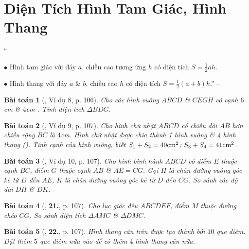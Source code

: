 \documentclass{article}
\numberwithin{equation}{section}
\newtheorem{baitoan}{Bài toán}[section]
\begin{document}

\section{Diện Tích Hình Tam Giác, Hình Thang}
``\begin{enumerate*}
	\item[$\bullet$] Hình tam giác với đáy $a$, chiều cao tương ứng $h$ có diện tích $S = \frac{1}{2}ah$.
	\item[$\bullet$] Hình thang với đáy $a$ \& $b$, chiều cao $h$ có diện tích $S = \frac{1}{2}(a + b)h$.'' -- \cite[p. 106]{Binh_Toan_6_tap_1}
\end{enumerate*}

\begin{baitoan}[\cite{Binh_Toan_6_tap_1}, Ví dụ 8, p. 106]
	Cho các hình vuông $ABCD$ \& $CEGH$ có cạnh $6$\emph{cm} \& $4$\emph{cm} \cite[Hình 36, p. 106]{Binh_Toan_6_tap_1}. Tính diện tích $\Delta BDG$.
\end{baitoan}

\begin{baitoan}[\cite{Binh_Toan_6_tap_1}, Ví dụ 9, p. 107]
	Cho hình chữ nhật $ABCD$ có chiều dài $AB$ hơn chiều rộng $BC$ là $4$\emph{cm}. Hình chữ nhật được chia thành 1 hình vuông \& 4 hình thang (\cite[Hình 38, p. 107]{Binh_Toan_6_tap_1}). Tính cạnh của hình vuông, biết $S_1 + S_2 = 49{\rm cm}^2$; $S_3 + S_4 = 41{\rm cm}^2$.
\end{baitoan}

\begin{baitoan}[\cite{Binh_Toan_6_tap_1}, Ví dụ 10, p. 107]
	Cho hình bình hành $ABCD$ có điểm $E$ thuộc cạnh $BC$, điểm $G$ thuộc cạnh $AB$ \& $AE = CG$. Gọi $H$ là chân đường vuông góc kẻ từ $D$ đến $AE$, $K$ là chân đường vuông góc kẻ từ $D$ đến $CG$. So sánh các độ dài $DH$ \& $DK$.
\end{baitoan}

\begin{baitoan}[\cite{Binh_Toan_6_tap_1}, \textbf{21.}, p. 107]
	Cho lục giác đều $ABCDEF$, điểm $M$ thuộc đường chéo $CG$. So sánh diện tích $\Delta AMC$ \& $\Delta DMC$.
\end{baitoan}

\begin{baitoan}[\cite{Binh_Toan_6_tap_1}, \textbf{22.}, p. 107]
	Hình thang cân trên \cite[Hình 41, p. 107]{Binh_Toan_6_tap_1} được tạo thành bởi $10$ que diêm. Đặt thêm $5$ que diêm nữa vào để có thêm $4$ hình thang cân nữa.
\end{baitoan}
\end{document}
